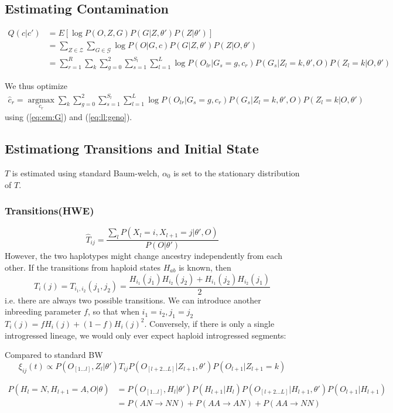 \documentclass[10pt,a4paper]{article}
\begin{document}
\subsection{Estimating Contamination}
\begin{align}
Q(c|c' )&= E[\log P(O, Z, G )  P(G|Z, \theta') P(Z | \theta')]\nonumber\\
&=\sum_{Z \in \mathcal{Z}}\sum_{G \in \mathcal{G}} \log P( O | G, c) P(G|Z, \theta') P(Z | O, \theta')\nonumber\\
&=\sum_{r=1}^R\sum_k\sum_{g=0}^2 \sum_{s=1}^{S_l}\sum_{l=1}^L \log P(O_{lr} | G_s=g, c_r)  P(G_s|Z_l=k, \theta', O) P(Z_l=k | O, \theta')
\end{align}

We thus optimize
\begin{align}
\hat{c}_r = \operatorname*{argmax}_{c_r}\sum_k\sum_{g=0}^2 \sum_{s=1}^{S_l}\sum_{l=1}^L \log P(O_{lr} | G_s=g, c_r)  P(G_s|Z_l=k, \theta', O) P(Z_l=k | O, \theta')
\end{align}
using (\ref{eq:em:G}) and (\ref{eq:ll:geno}).
\subsection{Estimationg Transitions and Initial State}
$T$ is estimated using standard Baum-welch, $\alpha_0$ is set to the stationary distribution of $T$.
\subsubsection{Transitions(HWE)}
$$\hat{T}_{ij} = \frac{\sum_l P(X_l=i, X_{l+1}=j| \theta', O)}{ P(O | \theta')}$$
However, the two haplotypes might change ancestry independently from each other. If the transitions from haploid states $H_{ab}$ is known, then 
$$T_i(j) = T_{i_1, i_2}(j_1, j_2) = \frac{H_{i_1}(j_1)H_{i_2}(j_2) + H_{i_1}(j_2)H_{i_2}(j_1)}{2}$$
i.e. there are always two possible transitions. We can introduce another inbreeding parameter $f$, so that when $i_1=i_2, j_1=j_2$ 
$T_i(j) = f H_i(j) + (1-f) H_i(j)^2$. Conversely, if there is only a single introgressed lineage, we would only ever expect haploid introgressed segments:



Compared to standard BW
$$\xi_{ij}(t) \propto P(O_{[1\dots l]}, Z_l | \theta') T_{ij}  P(O_{[l+2\dots L]}|Z_{l+1}, \theta') P(O_{l+1}|Z_{l+1}=k)$$

\begin{align}
P(H_l = N, H_{l+1} = A, O |\theta) &=  P(O_{[1\dots l]}, H_l | \theta') P(H_{l+1} | H_l) P(O_{[l+2\dots L]}|H_{l+1}, \theta') P(O_{l+1}|H_{l+1})\\
&=P(AN \to NN) + P(AA \to AN) + P(AA \to NN)
\end{align}
\end{document}
